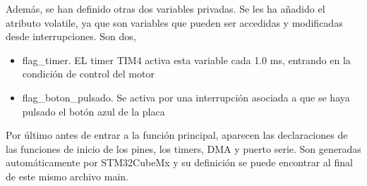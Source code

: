 Además, se han definido otras dos variables privadas. Se les ha añadido el atributo volatile, ya que son variables que pueden ser accedidas y modificadas desde interrupciones. Son dos,
\begin{itemize}
	\item flag\_timer. EL timer TIM4 activa esta variable cada 1.0 ms, entrando en la condición de control del motor
	\item flag\_boton\_pulsado. Se activa por una interrupción asociada a que se haya pulsado el botón azul de la placa
\end{itemize}

Por último antes de entrar a la función principal, aparecen las declaraciones de las funciones de inicio de los pines, los timers, DMA y puerto serie. Son generadas automáticamente por STM32CubeMx y su definición se puede encontrar al final de este mismo archivo main.

